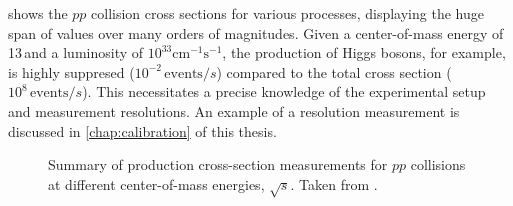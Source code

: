 
 shows the $pp$ collision cross sections for various processes, displaying the huge span of values over many orders of magnitudes. 
Given a center-of-mass energy of 13\,\TeV and a luminosity of $10^{33}\mathrm{cm^{-1}s^{-1}}$, the production of Higgs bosons, for example, is highly suppresed ($10^{-2}\,\text{events}/s$) compared to the total cross section ($10^8\,\text{events}/s$).
This necessitates a precise knowledge of the experimental setup and measurement resolutions. An example of a resolution  measurement is discussed in \cref{chap:calibration} of this thesis. 


\begin{figure}
  \caption[Summary of production cross-sections measurements for $pp$ collisions at different center-of-mass energy, $\sqrt{s}$.]{
    Summary of production cross-section measurements for $pp$ collisions at different center-of-mass energies, $\sqrt{s}$. Taken from .
    }
  \label{fig:xsec}
\end{figure}


